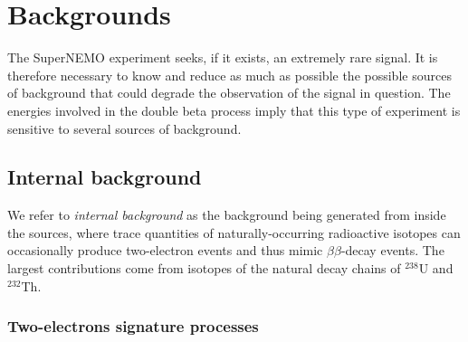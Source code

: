 
\section{Backgrounds}
\label{sec:SNbkg}

The SuperNEMO experiment seeks, if it exists, an extremely rare signal.
It is therefore necessary to know and reduce as much as possible the possible sources of background that could degrade the observation of the signal in question.
The energies involved in the double beta process imply that this type of experiment is sensitive to several sources of background.

\subsection{Internal background}
\label{subsec:SNbkg_internal}

We refer to \emph{internal background} as the background being generated from inside the sources, where trace quantities of naturally-occurring radioactive isotopes can occasionally produce two-electron events and thus mimic $\beta\beta$-decay events.
The largest contributions come from isotopes of the natural decay chains of $^{238}$U and $^{232}$Th.

\subsubsection*{Two-electrons signature processes}

